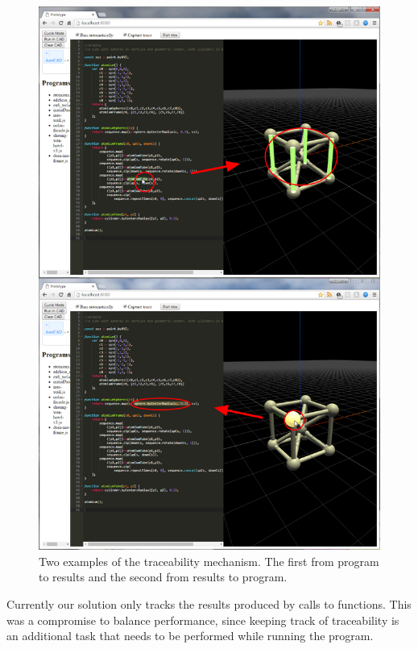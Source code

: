 \begin{figure}
  \centering
  \includegraphics[width=12cm]{./images/traceability_example}
  \caption{Two examples of the traceability mechanism. The first from program to results and the second from results to program.}
  \label{fig:trace:example}
\end{figure}

Currently our solution only tracks the results produced by calls to functions.
This was a compromise to balance performance, since keeping track of traceability is an additional task that needs to be performed while running the program.

